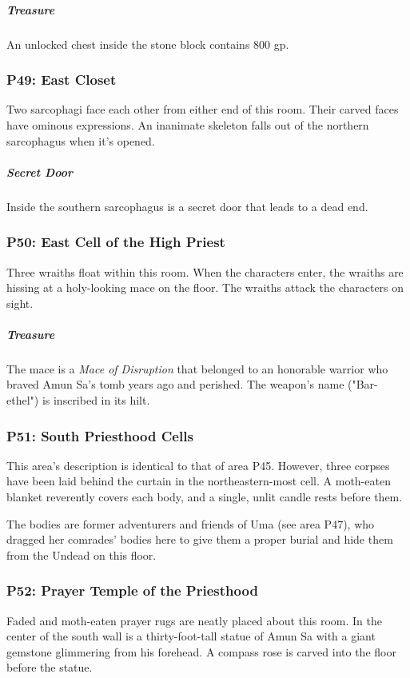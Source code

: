 \documentclass[10pt,a4paper,twoside,bg=print,twocolumn,openany,nodeprecatedcode]{dndbook}
\begin{document}
\subparagraph{Treasure}
An unlocked chest inside the stone block contains 800 gp.

\subsubsection{P49: East Closet}
Two sarcophagi face each other from either end of this room. Their carved faces have ominous expressions. An inanimate skeleton falls out of the northern sarcophagus when it's opened.

\subparagraph{Secret Door}
Inside the southern sarcophagus is a secret door that leads to a dead end.

\subsubsection{P50: East Cell of the High Priest}
Three wraiths float within this room. When the characters enter, the wraiths are hissing at a holy-looking mace on the floor. The wraiths attack the characters on sight.

\subparagraph{Treasure}
The mace is a \textit{Mace of Disruption} that belonged to an honorable warrior who braved Amun Sa's tomb years ago and perished. The weapon's name ("Bar-ethel") is inscribed in its hilt.

\subsubsection{P51: South Priesthood Cells}
This area's description is identical to that of area P45. However, three corpses have been laid behind the curtain in the northeastern-most cell. A moth-eaten blanket reverently covers each body, and a single, unlit candle rests before them.

The bodies are former adventurers and friends of Uma (see area P47), who dragged her comrades' bodies here to give them a proper burial and hide them from the Undead on this floor.

\subsubsection{P52: Prayer Temple of the Priesthood}
\begin{DndReadAloud}{}
Faded and moth-eaten prayer rugs are neatly placed about this room. In the center of the south wall is a thirty-foot-tall statue of Amun Sa with a giant gemstone glimmering from his forehead. A compass rose is carved into the floor before the statue.

\end{DndReadAloud}
\end{document}
